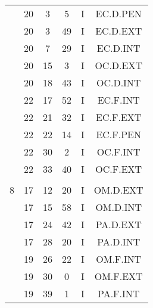 \documentclass[12pt, a4paper]{article}
\begin{document}
\begin{multicols}{3}
{\begin{tabular}{c c c c c c}
	 	 	 	 & 20 & 3 & 5 & I & EC.D.PEN\\%
	 	 	 	 & 20 & 3 & 49 & I & EC.D.EXT\\%
	 	 	 	 & 20 & 7 & 29 & I & EC.D.INT\\%
	 	 	 	 & 20 & 15 & 3 & I & OC.D.EXT\\%
	 	 	 	 & 20 & 18 & 43 & I & OC.D.INT\\%
	 	 	 	 & 22 & 17 & 52 & I & EC.F.INT\\%
	 	 	 	 & 22 & 21 & 32 & I & EC.F.EXT\\%
	 	 	 	 & 22 & 22 & 14 & I & EC.F.PEN\\%
	 	 	 	 & 22 & 30 & 2 & I & OC.F.INT\\%
	 	 	 	 & 22 & 33 & 40 & I & OC.F.EXT\\%
	 	 	 	 & & & & & \\%
	 	 	 	8 & 17 & 12 & 20 & I & OM.D.EXT\\%
	 	 	 	 & 17 & 15 & 58 & I & OM.D.INT\\%
	 	 	 	 & 17 & 24 & 42 & I & PA.D.EXT\\%
	 	 	 	 & 17 & 28 & 20 & I & PA.D.INT\\%
	 	 	 	 & 19 & 26 & 22 & I & OM.F.INT\\%
	 	 	 	 & 19 & 30 & 0 & I & OM.F.EXT\\%
	 	 	 	 & 19 & 39 & 1 & I & PA.F.INT\\%
	 	 \end{tabular}
 	}
\end{multicols}
\end{document}
